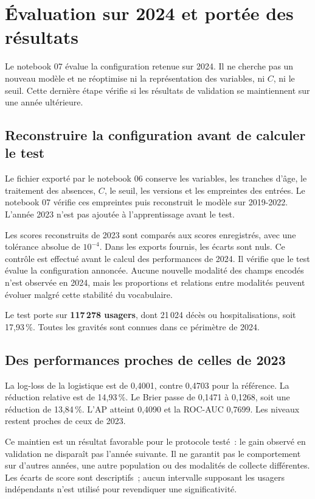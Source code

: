 \chapter{Évaluation sur 2024 et portée des résultats}
\label{chap:test-ml}

Le notebook 07 évalue la configuration retenue sur 2024. Il ne cherche pas un nouveau
modèle et ne réoptimise ni la représentation des variables, ni $C$, ni le seuil.
Cette dernière étape vérifie si les résultats de validation se maintiennent sur
une année ultérieure.

\section{Reconstruire la configuration avant de calculer le test}
Le fichier exporté par le notebook 06 conserve les variables, les tranches d'âge,
le traitement des absences, $C$, le seuil, les versions et les empreintes des entrées.
Le notebook 07 vérifie ces empreintes puis reconstruit le modèle sur 2019-2022.
L'année 2023 n'est pas ajoutée à l'apprentissage avant le test.

Les scores reconstruits de 2023 sont comparés aux scores enregistrés, avec une
tolérance absolue de $10^{-4}$. Dans les exports fournis, les écarts sont nuls.
Ce contrôle est effectué avant le calcul des performances de 2024. Il vérifie que
le test évalue la configuration annoncée. Aucune nouvelle modalité des champs encodés
n'est observée en 2024, mais les proportions et relations entre modalités peuvent
évoluer malgré cette stabilité du vocabulaire.

Le test porte sur \textbf{117\,278 usagers}, dont 21\,024 décès ou hospitalisations,
soit 17,93\,\%. Toutes les gravités sont connues dans ce périmètre de 2024.

\section{Des performances proches de celles de 2023}

La log-loss de la logistique est de 0,4001, contre 0,4703 pour la référence.
La réduction relative est de 14,93\,\%. Le Brier passe de 0,1471 à 0,1268,
soit une réduction de 13,84\,\%. L'AP atteint 0,4090 et la ROC-AUC 0,7699.
Les niveaux restent proches de ceux de 2023.

Ce maintien est un résultat favorable pour le protocole testé~: le gain observé
en validation ne disparaît pas l'année suivante. Il ne garantit pas le comportement
sur d'autres années, une autre population ou des modalités de collecte différentes.
Les écarts de score sont descriptifs~; aucun intervalle supposant les usagers
indépendants n'est utilisé pour revendiquer une significativité.

